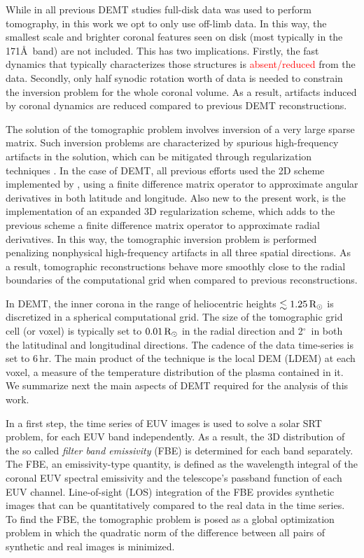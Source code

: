 \documentclass[namedreferences]{solarphysics}
\def\edit#1{\textcolor{Red}{#1}}
\renewcommand{\deg}{$^\circ$}
\newcommand{\mrsun}{{\rm R_\odot}}
\begin{document}
\begin{article}
{While in all previous DEMT studies full-disk data was used to perform tomography, in this work we {opt} to only use off-limb data. In this way, the smallest scale and brighter coronal features seen on disk (most typically in the 171\AA\ band) are not included. This has two implications. Firstly, the fast dynamics that typically characterizes those structures is \edit{absent/reduced} from the data. Secondly, only half synodic rotation worth of data is needed to constrain the inversion problem for the whole coronal volume. As a result, {artifacts induced by coronal dynamics} are reduced compared to previous DEMT reconstructions.}

{The solution of the tomographic problem involves {inversion of} a very large sparse matrix. Such inversion problems are characterized by spurious {high-fre\-quen\-cy} artifacts in the solution, which can be mitigated through {regularization} techniques \citep{frazin_2000}. In the case of DEMT, all previous efforts used the 2D scheme implemented by \citet{frazin_2009}, using a finite difference matrix operator to approximate angular derivatives in both latitude and longitude. Also new to the present work, is the implementation of an expanded 3D regularization scheme, which adds to the previous scheme a finite difference matrix operator to approximate radial derivatives. In this way, the tomographic inversion problem is performed penalizing nonphysical high-frequency artifacts in all three spatial directions. As a result, tomographic reconstructions behave more smoothly close to the radial boundaries of the computational grid {when compared to previous reconstructions.}}

{In DEMT, the inner corona in the range of heliocentric heights $\lesssim 1.25\,\mrsun$ is discretized in a spherical computational grid. The size of the tomographic grid cell (or voxel) is typically set to $0.01\,\mrsun$ in the radial direction and 2\deg\ in both the latitudinal and longitudinal directions. The cadence of the data time-series is set to 6\,hr. The main product of the technique is the local DEM (LDEM) at each voxel, a measure of the temperature distribution of the plasma contained in it. We summarize next the main aspects of DEMT required for the analysis of this work.}

In a first step, the time series of EUV images is used to solve a solar SRT problem, for each EUV band independently. As a result, the 3D distribution of the so called \emph{filter band emissivity} (FBE) is determined for each band separately. The FBE, {an emissivity-type quantity}, is defined as the wavelength integral of the coronal EUV spectral emissivity and the telescope's passband function of each EUV channel. Line-of-sight (LOS) integration of the FBE provides synthetic images that can be quantitatively compared to the real data in the time series. To find the FBE, the tomographic problem is posed as a global optimization problem in which the quadratic norm of the difference between all {pairs of synthetic and real images is minimized.}


\end{article}
\end{document}
